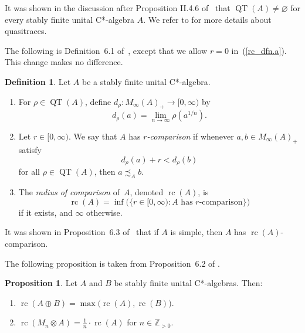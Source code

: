 \documentclass[10pt]{amsart}
\numberwithin{equation}{section}
\theoremstyle{definition}
\newtheorem{prp}[thm]{Proposition}
\newtheorem{dfn}[thm]{Definition}
\newcommand{\N}{{\mathbb{Z}}_{> 0}}
\newcommand{\QT}{{\operatorname{QT}}}
\newcommand{\rc}{{\operatorname{rc}}}
\newcommand{\Mi}{M_{\infty}}
\newcommand{\I}{\infty}
\begin{document}
It was shown in the discussion after Proposition II.4.6 of~\cite{BH82} that 
$\QT ( A )\neq \varnothing$ for every stably finite unital C*-algebra $A$.  
We refer to \cite{BH82, Hag14} for more details about quasitraces. 

The following is Definition~6.1 of~\cite{Tom06},
except that we allow $r = 0$ in~(\ref{rc_dfn.a}).
This change makes no difference.

\begin{dfn}\label{rc_dfn}
Let $A$ be a stably finite unital C*-algebra.

\begin{enumerate}
\item
For $\rho \in \QT(A)$, define $d_{\rho} \colon \Mi (A)_{+} \to [0, \infty)$
by
\[
d_{\rho} (a) = \lim_{n \to \infty} \rho (a^{1/n}).
\]
\item\label{rc_dfn.a}
Let $r \in [0, \I)$.
We say that $A$ has {\emph{$r$-comparison}} if whenever
$a, b \in M_{\infty} (A)_{+}$ satisfy
\[
d_{\rho} (a) + r < d_{\rho} (b)\]
for all $\rho \in \QT (A)$,
then $a \precsim_A b$.
\item\label{rc_dfn.b}
The {\emph{radius of comparison}} of~$A$,
denoted ${\operatorname{rc}} (A)$, is
\[
\rc (A)
 = \inf \big( \big\{ r \in [0, \I) \colon
    {\mbox{$A$ has $r$-comparison}} \big\} \big)
\]
if it exists, and $\infty$ otherwise.
\end{enumerate}
\end{dfn}
It was shown in Proposition~6.3 of~\cite{Tom06} that if $A$ is simple, then $A$ has ${\operatorname{rc}} (A)$-comparison.
%

The following proposition is taken from Proposition~6.2 of \cite{Tom06}.
\begin{prp}
\label{Prp6.2.Tom06}
Let $A$ and $B$ be  stably finite unital C*-algebras. Then:
\begin{enumerate}
\item
\label{Prp6.2.Tom06.a}
$\rc (A \oplus B) = \max \big(\rc (A), \rc(B)\big)$.
\item
\label{Prp6.2.Tom06.b}
$\rc (M_n \otimes A)= \frac{1}{n} \cdot \rc (A)$ for $n \in \N$.
\end{enumerate}

\end{prp}
\end{document}
